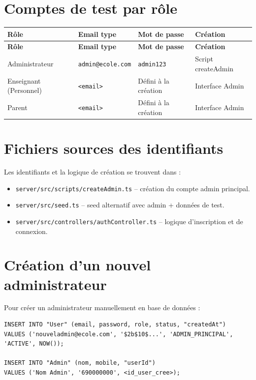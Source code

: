 \documentclass[12pt,a4paper]{report}
\begin{document}
\section{Comptes de test par rôle}

\begin{longtable}{|p{3.5cm}|p{4cm}|p{3.5cm}|p{3.5cm}|}
\hline
\textbf{Rôle} & \textbf{Email type} & \textbf{Mot de passe} & \textbf{Création} \\
\hline
\endfirsthead
\hline
\textbf{Rôle} & \textbf{Email type} & \textbf{Mot de passe} & \textbf{Création} \\
\hline
\endhead
Administrateur & \texttt{admin@ecole.com} & \texttt{admin123} & Script createAdmin \\
\hline
Enseignant (Personnel) & \texttt{<email>} & Défini à la création & Interface Admin \\
\hline
Parent & \texttt{<email>} & Défini à la création & Interface Admin \\
\hline
\end{longtable}

\section{Fichiers sources des identifiants}

Les identifiants et la logique de création se trouvent dans :
\begin{itemize}
    \item \texttt{server/src/scripts/createAdmin.ts} -- création du compte admin principal.
    \item \texttt{server/src/seed.ts} -- seed alternatif avec admin + données de test.
    \item \texttt{server/src/controllers/authController.ts} -- logique d'inscription et de connexion.
\end{itemize}

\section{Création d'un nouvel administrateur}

Pour créer un administrateur manuellement en base de données :
\begin{lstlisting}
INSERT INTO "User" (email, password, role, status, "createdAt")
VALUES ('nouveladmin@ecole.com', '$2b$10$...', 'ADMIN_PRINCIPAL', 'ACTIVE', NOW());

INSERT INTO "Admin" (nom, mobile, "userId")
VALUES ('Nom Admin', '690000000', <id_user_cree>);
\end{lstlisting}
\end{document}
